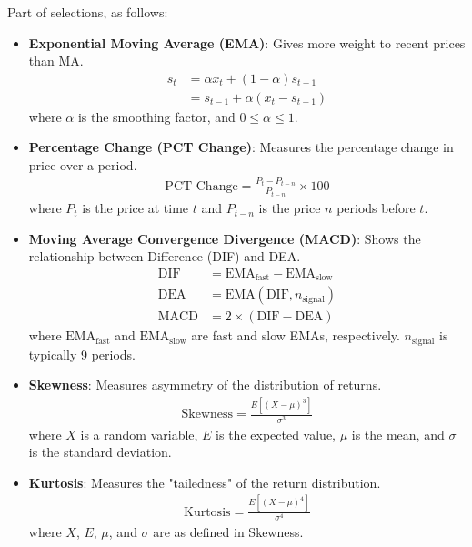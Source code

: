 \documentclass[10pt,twocolumn,letterpaper]{article}
\begin{document}
Part of selections, as follows:
\begin{itemize}
	\item \textbf{Exponential Moving Average (EMA)}: Gives more weight to recent prices than MA.
	      \begin{align*}
		      s_t & = \alpha x_t + (1 - \alpha) s_{t-1} \\
		          & = s_{t-1} + \alpha (x_t - s_{t-1})
	      \end{align*}
	      where \( \alpha \) is the smoothing factor, and \( 0 \leq \alpha \leq 1 \).

	\item \textbf{Percentage Change (PCT Change)}: Measures the percentage change in price over a period.
	      \begin{align*}
		      \text{PCT Change} = \frac{P_t - P_{t-n}}{P_{t-n}} \times 100
	      \end{align*}
	      where \( P_t \) is the price at time \( t \) and \( P_{t-n} \) is the price \( n \) periods before \( t \).

	\item \textbf{Moving Average Convergence Divergence (MACD)}: Shows the relationship between Difference (DIF) and DEA.
		\begin{align*}
			\text{DIF} &= \text{EMA}_{\text{fast}} - \text{EMA}_{\text{slow}} \\
			\text{DEA} &= \text{EMA}(\text{DIF}, n_{\text{signal}}) \\
			\text{MACD} &= 2 \times (\text{DIF} - \text{DEA})
		\end{align*}
		where \( \text{EMA}_{\text{fast}} \) and \( \text{EMA}_{\text{slow}} \) are fast and slow EMAs, respectively. \( n_{\text{signal}} \) is typically 9 periods.

	\item \textbf{Skewness}: Measures asymmetry of the distribution of returns.
	      \begin{align*}
		      \text{Skewness} = \frac{E[(X-\mu)^3]}{\sigma^3}
	      \end{align*}
	      where \( X \) is a random variable, \( E \) is the expected value, \( \mu \) is the mean, and \( \sigma \) is the standard deviation.

	\item \textbf{Kurtosis}: Measures the "tailedness" of the return distribution.
	      \begin{align*}
		      \text{Kurtosis} = \frac{E[(X-\mu)^4]}{\sigma^4}
	      \end{align*}
	      where \( X \), \( E \), \( \mu \), and \( \sigma \) are as defined in Skewness.


\end{itemize}
\end{document}

